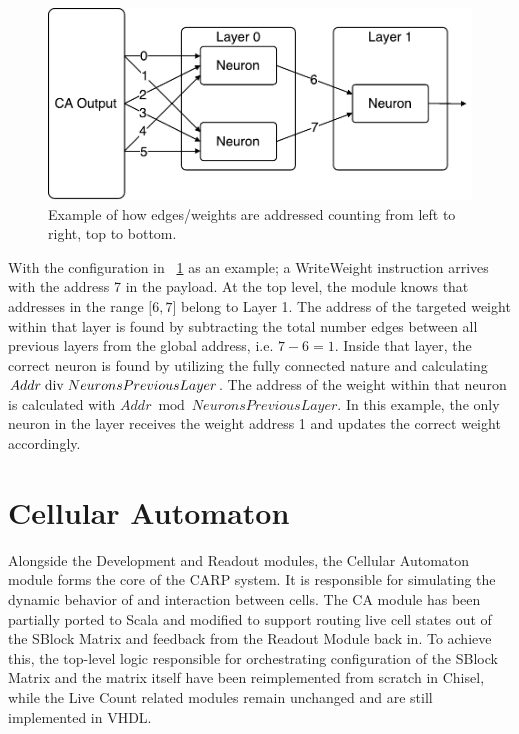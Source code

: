 \begin{figure}[ht]
  \centering
  \includegraphics[width=0.6\linewidth]{fig/readout-addressing-scheme}
  \caption[Weight addressing scheme]{Example of how edges/weights are addressed counting from left to right, top to bottom.}
  \label{fig:readout-addressing-scheme}
\end{figure}

With the configuration in \figurename~\ref{fig:readout-addressing-scheme} as an
example; a WriteWeight instruction arrives with the address 7 in the payload. At
the top level, the module knows that addresses in the range $\lbrack 6, 7 \rbrack$ belong to
Layer 1. The address of the targeted weight within that layer is found by
subtracting the total number edges between all previous layers from the global
address, i.e. $7 - 6 = 1$. Inside that layer, the correct neuron is found by
utilizing the fully connected nature and calculating $Addr \bdiv NeuronsPrevious
Layer$. The address of the weight within that neuron is calculated with $Addr
\bmod NeuronsPreviousLayer$. In this example, the only neuron in the layer
receives the weight address 1 and updates the correct weight accordingly.

\section{Cellular Automaton}
\label{sec:cellular-automaton}

Alongside the Development and Readout modules, the Cellular Automaton module forms
the core of the CARP system. It is responsible for simulating the dynamic
behavior of and interaction between cells. The CA module has been partially
ported to Scala and modified to support routing live cell states out of the
SBlock Matrix and feedback from the Readout Module back in. To achieve this, the
top-level logic responsible for orchestrating configuration of the SBlock Matrix
and the matrix itself have been reimplemented from scratch in Chisel, while the
Live Count related modules remain unchanged and are still implemented in VHDL.

